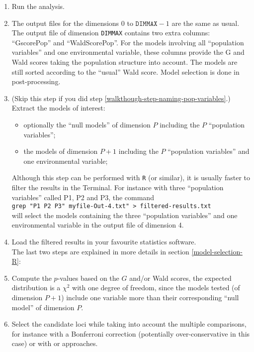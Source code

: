 \documentclass[a4paper,11pt]{article}
\newcommand{\prog}[1]{\texttt{#1}}
\begin{document}
\begin{enumerate}
{The order in which the variables will be considered during the analysis is determined by the order of the columns in the input file.}
\item{Run the analysis.}
\item{The output files for the dimensions $0$ to $\texttt{DIMMAX}-1$ are the same as usual.
The output file of dimension \texttt{DIMMAX} contains two extra columns: \enquote{GscorePop} and \enquote{WaldScorePop}.
For the models involving all \enquote{population variables} and one environmental variable, these columns provide the G and Wald scores taking the population structure into account.
The models are still sorted according to the \enquote{usual} Wald score.
Model selection is done in post-processing.}
\item{\label{walkthough-step-extracting-models}
(Skip this step if you did step \ref{walkthough-step-naming-pop-variables}.)
Extract the models of interest:
\begin{itemize}
\item{optionally the \enquote{null models} of dimension $P$ including the $P$ \enquote{population variables};}
\item{the models of dimension $P+1$ including the $P$ \enquote{population variables} and one environmental variable;}
\end{itemize}
Although this step can be performed with \prog{R} (or similar), it is usually faster to filter the results in the Terminal. 
For instance with three \enquote{population variables} called P1, P2 and P3, the command \\
\verb+grep "P1 P2 P3" myfile-Out-4.txt" > filtered-results.txt+ \\
will select the models containing the three \enquote{population variables} and one environmental variable in the output file of dimension 4.}
\item{Load the filtered results in your favourite statistics software. \\
The last two steps are explained in more details in section \ref{model-selection-R}:}
\item{Compute the $p$-values based on the $G$ and/or Wald scores, the expected distribution is a $\chi^2$ with one degree of freedom, since the models tested (of dimension $P+1$) include one variable more than their corresponding \enquote{null model} of dimension $P$.}
\item{Select the candidate loci while taking into account the multiple comparisons, for instance with a Bonferroni correction (potentially over-conservative in this case) or with \textcite{storey:2003} or \textcite{benjamini:1995} approaches.}
\end{enumerate}
\end{document}
